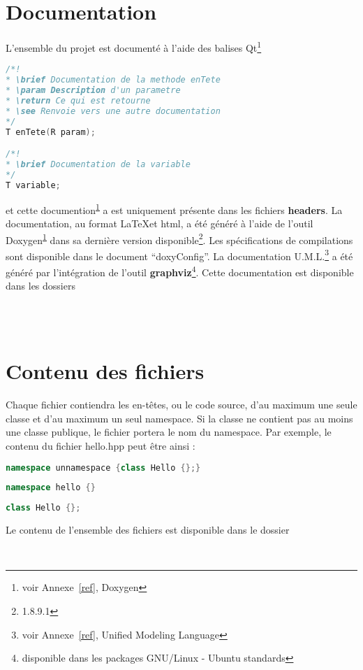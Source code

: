 \documentclass[a4paper,11pt]{report}
\begin{document}
\section{Documentation}
L'ensemble du projet est documenté à l'aide des balises Qt\footnote{\label{doc}voir
Annexe~\ref{ref}, Doxygen}
\begin{lstlisting}[frame=single,language=C++]
/*!
* \brief Documentation de la methode enTete
* \param Description d'un parametre
* \return Ce qui est retourne
* \see Renvoie vers une autre documentation
*/
T enTete(R param);

/*!
* \brief Documentation de la variable
*/
T variable;
\end{lstlisting}
et cette documention\textsuperscript{\ref{doc}} a est uniquement présente dans les fichiers \textbf{headers}.
La documentation, au format \LaTeX et html, a été généré à l'aide de l'outil
Doxygen\textsuperscript{\ref{doc}} dans sa dernière version
disponible\footnote{1.8.9.1}. Les spécifications de compilations sont disponible
dans le document ``doxyConfig''. La documentation
U.M.L.\footnote{voir Annexe~\ref{ref}, Unified Modeling Language} a été généré 
par l'intégration de l'outil \textbf{graphviz}\footnote{disponible dans les packages GNU/Linux -
Ubuntu standards}.
Cette documentation est disponible dans les dossiers
\begin{center}
	 \\
	 \\
\end{center}
\section{Contenu des fichiers}
Chaque fichier contiendra les en-têtes, ou le code source, d'au maximum une seule 
classe et d'au maximum un seul namespace. Si la classe ne contient pas au moins
une classe publique, le fichier portera le nom du namespace.
Par exemple, le contenu du fichier hello.hpp peut être ainsi :
\begin{lstlisting}[frame=single,language=C++]
namespace unnamespace {class Hello {};}
\end{lstlisting}
\begin{lstlisting}[frame=single,language=C++]
namespace hello {}
\end{lstlisting}
\begin{lstlisting}[frame=single,language=C++]
class Hello {};
\end{lstlisting}
Le contenu de l'ensemble des fichiers est disponible dans le dossier
\begin{center}
	 \\
\end{center}
\end{document}
